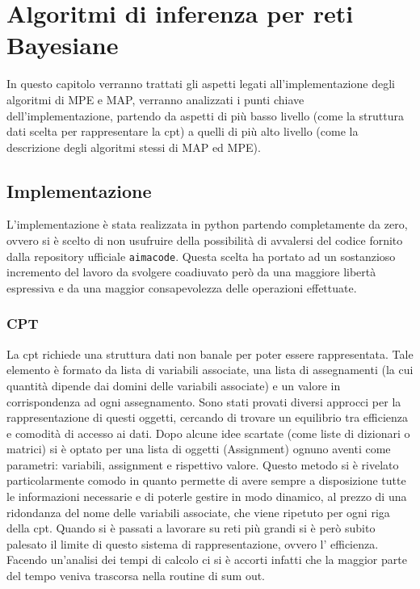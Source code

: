 \chapter{Algoritmi di inferenza per reti Bayesiane}
In questo capitolo verranno trattati gli aspetti legati all'implementazione degli algoritmi di MPE e MAP, verranno analizzati i punti chiave dell’implementazione, partendo da aspetti di più basso livello (come la struttura dati scelta per rappresentare la cpt) a quelli di più alto livello (come la descrizione degli algoritmi stessi di MAP ed MPE).

\section{Implementazione}
L’implementazione è stata realizzata in python partendo completamente da zero, ovvero si è scelto di non usufruire della possibilità di avvalersi del codice fornito dalla repository ufficiale \texttt{aimacode}. Questa scelta ha portato ad un sostanzioso incremento del lavoro da svolgere coadiuvato però da una maggiore libertà espressiva e da una maggior consapevolezza delle operazioni effettuate.

\subsection{CPT}
La cpt richiede una struttura dati non banale per poter essere rappresentata. Tale elemento è formato da lista di variabili associate, una lista di assegnamenti (la cui quantità dipende dai domini delle variabili associate) e un valore in corrispondenza ad ogni assegnamento. Sono stati provati diversi approcci per la rappresentazione di questi oggetti, cercando di trovare un equilibrio tra efficienza e comodità di accesso ai dati. Dopo alcune idee scartate (come liste di dizionari o matrici) si è optato per una lista di oggetti (Assignment) ognuno aventi come parametri: variabili, assignment e rispettivo valore. Questo metodo si è rivelato particolarmente comodo in quanto permette di avere sempre a disposizione tutte le informazioni necessarie e di poterle gestire in modo dinamico, al prezzo di una ridondanza del nome delle variabili associate, che viene ripetuto per ogni riga della cpt. Quando si è passati a lavorare su reti più grandi si è però subito palesato il limite di questo sistema di rappresentazione, ovvero l’ efficienza. Facendo un’analisi dei tempi di calcolo ci si è accorti infatti che la maggior parte del tempo veniva trascorsa nella routine di sum out.

